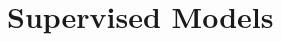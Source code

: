 \documentclass[12pt]{article}
\begin{document}
\pagebreak
\section{Supervised Models}
\end{document}
